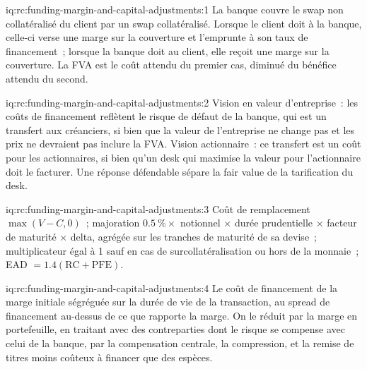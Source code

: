 \begin{solution}{iq:rc:funding-margin-and-capital-adjustments:1}
La banque couvre le swap non collatéralisé du client par un swap collatéralisé. Lorsque le client
doit à la banque, celle-ci verse une marge sur la couverture et l'emprunte à son taux de financement~; lorsque la
banque doit au client, elle reçoit une marge sur la couverture. La FVA est le coût attendu du premier cas,
diminué du bénéfice attendu du second.
\end{solution}

\begin{solution}{iq:rc:funding-margin-and-capital-adjustments:2}
Vision en valeur d'entreprise~: les coûts de financement reflètent le risque de défaut de la banque, qui est un transfert aux créanciers, si bien que la
valeur de l'entreprise ne change pas et les prix ne devraient pas inclure la FVA. Vision actionnaire~: ce
transfert est un coût pour les actionnaires, si bien qu'un desk qui maximise la valeur pour l'actionnaire doit le facturer. Une
réponse défendable sépare la fair value de la tarification du desk.
\end{solution}

\begin{solution}{iq:rc:funding-margin-and-capital-adjustments:3}
Coût de remplacement $\max(V-C,0)$~; majoration $0.5~\%\times$ notionnel $\times$ durée prudentielle
$\times$ facteur de maturité $\times$ delta, agrégée sur les tranches de maturité de sa devise~;
multiplicateur égal à 1 sauf en cas de surcollatéralisation ou hors de la monnaie~; EAD $= 1.4(\mathrm{RC}+\mathrm{PFE})$.
\end{solution}

\begin{solution}{iq:rc:funding-margin-and-capital-adjustments:4}
Le coût de financement de la marge initiale ségréguée sur la durée de vie de la transaction, au spread de financement
au-dessus de ce que rapporte la marge. On le réduit par la marge en portefeuille, en traitant avec des contreparties dont le risque
se compense avec celui de la banque, par la compensation centrale, la compression, et la remise de titres moins coûteux à financer que des espèces.
\end{solution}

